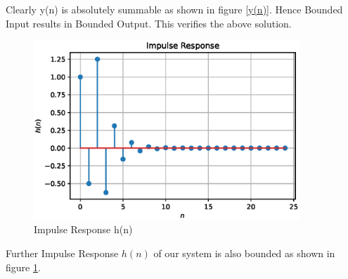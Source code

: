 \documentclass[journal,12pt,twocolumn]{IEEEtran}
\begin{document}
Clearly y(n) is absolutely summable as shown in figure \ref{y(n)}. Hence Bounded Input results in Bounded Output. This verifies the above solution.


\begin{figure}[h!]
    \centering
    \includegraphics[width=10cm]{./figs/fig_h.eps}
    \caption{Impulse Response h(n)}
    \label{h(n)}
\end{figure}

Further Impulse Response $h(n)$ of our system is also bounded as shown in figure \ref{h(n)}.
\end{document}
